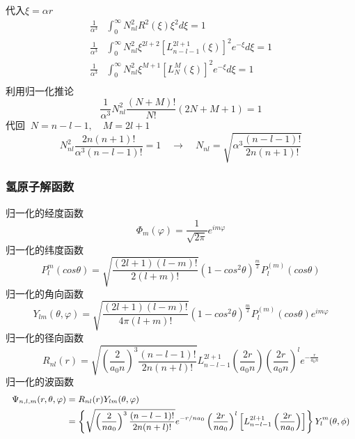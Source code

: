 \begin{frame}[label=current]
\frametitle{} 
代入$\xi = \alpha r$
\begin{equation*}
  \begin{split}
  \frac{1}{\alpha^3 }	&\int_{0}^{\infty}  N^2_{nl}  R^2 (\xi)  \xi^2 d\xi =1   \\
  \frac{1}{\alpha^3 } &	\int_{0}^{\infty}  N^2_{nl}  \xi ^{2l+2}  [L_{n-l-1} ^{2l+1} (\xi)]^2 e^{-\xi}  d\xi =1   \\
  \frac{1}{\alpha^3 } &	\int_{0}^{\infty}  N^2_{nl}  \xi ^{M+1}  [L_N ^M (\xi)]^2 e^{-\xi}  d\xi =1   \\
  \end{split}		
  \end{equation*}
  利用归一化推论
  \begin{equation*}
    \frac{1}{\alpha^3} 	  N^2_{nl}  \frac{(N+M)!}{N!} (2N+M+1) =1  	
  \end{equation*}	
  代回 $~ N = n-l-1, \quad M = 2l+1$
  \begin{equation*}
    N^2 _{nl}  \frac{2n (n+1)!} {\alpha ^3 (n-l-1)!} =1 \quad \to \quad N_{nl}  =\sqrt{\alpha^3 \frac{ (n-l-1)!}{2n (n+1)!}}
  \end{equation*} 
\end{frame}	


\begin{frame}[label=current]
\frametitle{氢原子解函数}
归一化的经度函数
\begin{equation*}
\Phi_m (\varphi) = \frac{1}{\sqrt{2\pi}} e^{im\varphi}
\end{equation*}
归一化的纬度函数
\begin{equation*}
P_l ^m (cos \theta)= \sqrt{\frac{(2l+1)(l-m)!}{2 (l+m)!}}  (1-cos^2 \theta)^{\frac{m}{2}}P^{(m)} _l(cos \theta)
\end{equation*}
归一化的角向函数
\[ Y_{lm} (\theta,\varphi)= \sqrt{\frac{(2l+1)(l-m)!}{4\pi (l+m)!}} (1-cos^2 \theta)^{\frac{m}{2}}P^{(m)} _l(cos \theta)  e^{im\varphi}\]
归一化的径向函数
\[R_{nl}(r) = \sqrt{\left(\frac{2}{a_0 n}\right)^3 \frac{ (n-l-1)!}{2n (n+l)!}} L_{n-l-1} ^{2l+1} (\frac{2r}{a_0 n}) \left(\frac{2r}{a_0 n}\right)^l e^{-\frac{r}{a_0 n}} \]
归一化的波函数
\[ \small
\begin{aligned}
\Psi _{n,l,m}(r,\theta,\varphi) & = R_{nl}(r) Y_{lm} (\theta,\varphi) \\
&= \left\{\sqrt{ \left( \frac{2}{n a_0}\right)^3 \frac{(n-l-1)!}{2n(n+l)!} } e^{-r/na_0} \left( \frac{2r}{na_0} \right)^l \left[ L^{2l+1}_{n-l-1} \left( \frac{2r}{na_0} \right) \right]\right\} Y^m_l(\theta,\phi) 
\end{aligned}  
\]
\end{frame} 

